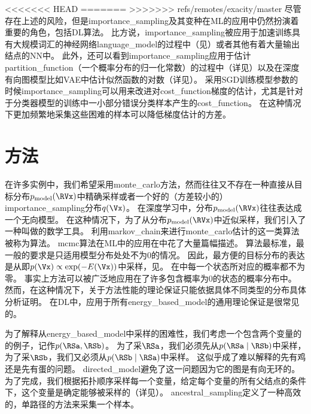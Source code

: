 <<<<<<< HEAD
=======
>>>>>>> refs/remotes/exacity/master
尽管存在上述的风险，但是\gls{importance_sampling}及其变种在\gls{ML}的应用中仍然扮演着重要的角色，包括\gls{DL}算法。
比方说，\gls{importance_sampling}被应用于加速训练具有大规模词汇的神经网络\gls{language_model}的过程中（见）或者其他有着大量输出结点的\gls{NN}中。
此外，还可以看到\gls{importance_sampling}应用于估计\gls{partition_function}（一个概率分布的归一化常数）的过程中（详见）以及在深度有向图模型比如\gls{VAE}中估计似然函数的对数（详见）。
采用\gls{SGD}训练模型参数的时候\gls{importance_sampling}可以用来改进对\gls{cost_function}梯度的估计，尤其是针对于分类器模型的训练中一小部分错误分类样本产生的\gls{cost_function}。
在这种情况下更加频繁地采集这些困难的样本可以降低梯度估计的方差\citep{Hinton06}。


\section{方法}
\label{sec:markov_chain_monte_carlo_methods}

在许多实例中，我们希望采用\gls{monte_carlo}方法，然而往往又不存在一种直接从目标分布$p_{\text{model}}(\RVx)$中精确采样或者一个好的（方差较小的）\gls{importance_sampling}分布$q(\Vx)$。
在深度学习中，分布$p_{\text{model}}(\RVx)$往往表达成一个无向模型。
在这种情况下，为了从分布$p_{\text{model}}(\RVx)$中近似采样，我们引入了一种叫做的数学工具。
利用\gls{markov_chain}来进行\gls{monte_carlo}估计的这一类算法被称为算法。
\gls{mcmc}算法在\gls{ML}中的应用在\citet{koller-book2009}中花了大量篇幅描述。
算法最标准，最一般的要求是只适用模型分布处处不为$0$的情况。
因此，最方便的目标分布的表达是从即$p(\Vx)\propto \exp(-E(\Vx))$中采样，见。
在中每一个状态所对应的概率都不为零。
事实上方法可以被广泛地应用在了许多包含概率为$0$的状态的概率分布中。
然而，在这种情况下，关于方法性能的理论保证只能依据具体不同类型的分布具体分析证明。
在\gls{DL}中，应用于所有\gls{energy_based_model}的通用理论保证是很常见的。


为了解释从\gls{energy_based_model}中采样的困难性，我们考虑一个包含两个变量的的例子，记作$p(\RSa,\RSb)$。
为了采$\RSa$，我们必须先从$p(\RSa\mid \RSb)$中采样，为了采$\RSb$，我们又必须从$p(\RSb\mid \RSa)$中采样。
这似乎成了难以解释的先有鸡还是先有蛋的问题。
\gls{directed_model}避免了这一问题因为它的图是有向无环的。
为了完成，我们根据拓扑顺序采样每一个变量，给定每个变量的所有父结点的条件下，这个变量是确定能够被采样的（详见）。
\gls{ancestral_sampling}定义了一种高效的，单路径的方法来采集一个样本。


